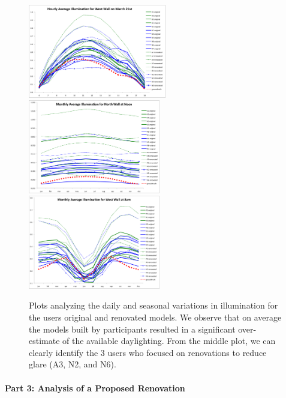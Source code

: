 \begin{figure}[t]
\includegraphics[height=1.61in]{../uist2012/hourly_west_march_21.png}
\includegraphics[height=1.61in]{../uist2012/montly_average_north_wall_noon.png}
\includegraphics[height=1.61in]{../uist2012/monthly_average_west_wall_8am.png}
\caption{
%
Plots analyzing the daily and seasonal variations in
illumination for the users original and renovated models.  We observe
that on average the models built by participants resulted in a
significant over-estimate of the available daylighting.  From the
middle plot, we can clearly identify the 3 users who focused on
renovations to reduce glare (A3, N2, and N6).
%
}
\label{figure:plots}
\vspace{-0.1in}
\end{figure}

\paragraph{Part 3: Analysis of a Proposed Renovation}



